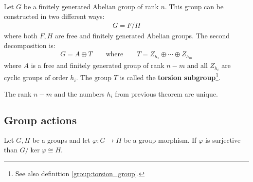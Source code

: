 	\begin{theorem}\label{group:theorem:free_group}
		Let $G$ be a finitely generated Abelian group of rank $n$. This group can be constructed in two different ways:
		\begin{gather}
			G = F/H
		\end{gather}
		where both $F, H$ are free and finitely generated Abelian groups. The second decomposition is:
		\begin{gather}
			G = A\oplus T\qquad\text{where}\qquad T = Z_{h_1}\oplus\cdots\oplus Z_{h_m}
		\end{gather}
		where $A$ is a free and finitely generated group of rank $n-m$ and all $Z_{h_i}$ are cyclic groups of order $h_i$. The group $T$ is called the \textbf{torsion subgroup}\footnote{See also definition \ref{group:torsion_group}.}.
	\end{theorem}
	
	\begin{property}
		The rank $n-m$ and the numbers $h_i$ from previous theorem are unique.
	\end{property}

\subsection{Group actions}

        
        
        \begin{theorem}\label{group:theorem:first_isomorphism_theorem}
        	Let $G, H$ be a groups and let $\varphi:G\rightarrow H$ be a group morphism. If $\varphi$ is surjective than $G/\ker\varphi\cong H$.
        \end{theorem}
        
